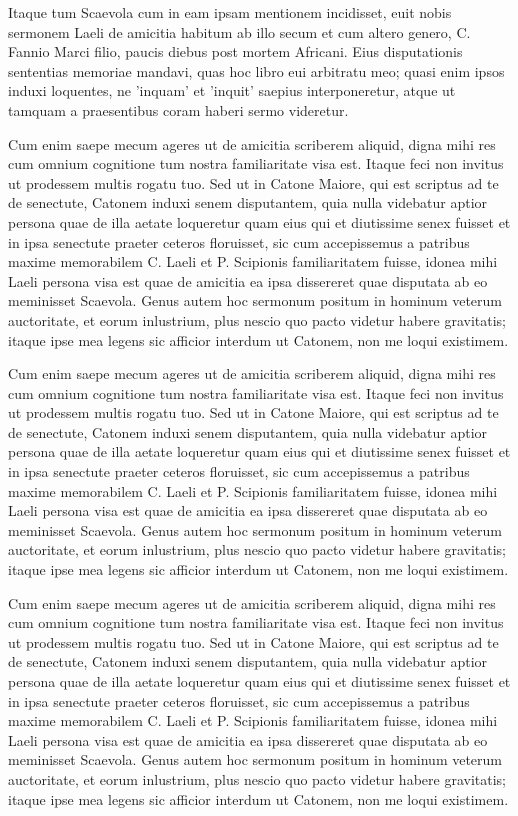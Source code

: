 \documentclass[a4paper]{book}
\begin{document}
\pstart%
    Itaque tum Scaevola cum in eam ipsam mentionem incidisset, euit nobis sermonem Laeli de amicitia habitum ab illo secum et cum altero genero, C. Fannio Marci filio, paucis diebus post mortem Africani. Eius disputationis sententias memoriae mandavi, quas hoc libro eui arbitratu meo; quasi enim ipsos induxi loquentes, ne 'inquam' et 'inquit' saepius interponeretur, atque ut tamquam a praesentibus coram haberi sermo videretur.%
\pend

\pstart%
    Cum enim saepe mecum ageres ut de amicitia scriberem aliquid, digna mihi res cum omnium cognitione tum nostra familiaritate visa est. Itaque feci non invitus ut prodessem multis rogatu tuo. Sed ut in Catone Maiore, qui est scriptus ad te de senectute, Catonem induxi senem disputantem, quia nulla videbatur aptior persona quae de illa aetate loqueretur quam eius qui et diutissime senex fuisset et in ipsa senectute praeter ceteros floruisset, sic cum accepissemus a patribus maxime memorabilem C. Laeli et P. Scipionis familiaritatem fuisse, idonea mihi Laeli persona visa est quae de amicitia ea ipsa dissereret quae disputata ab eo meminisset Scaevola. Genus autem hoc sermonum positum in hominum veterum auctoritate, et eorum inlustrium, plus nescio quo pacto videtur habere gravitatis; itaque ipse mea legens sic afficior interdum ut Catonem, non me loqui existimem.%
\pend

\pstart%
    Cum enim saepe mecum ageres ut de amicitia scriberem aliquid, digna mihi res cum omnium cognitione tum nostra familiaritate visa est. Itaque feci non invitus ut prodessem multis rogatu tuo. Sed ut in Catone Maiore, qui est scriptus ad te de senectute, Catonem induxi senem disputantem, quia nulla videbatur aptior persona quae de illa aetate loqueretur quam eius qui et diutissime senex fuisset et in ipsa senectute praeter ceteros floruisset, sic cum accepissemus a patribus maxime memorabilem C. Laeli et P. Scipionis familiaritatem fuisse, idonea mihi Laeli persona visa est quae de amicitia ea ipsa dissereret quae disputata ab eo meminisset Scaevola. Genus autem hoc sermonum positum in hominum veterum auctoritate, et eorum inlustrium, plus nescio quo pacto videtur habere gravitatis; itaque ipse mea legens sic afficior interdum ut Catonem, non me loqui existimem.%
\pend

\pstart%
    Cum enim saepe mecum ageres ut de amicitia scriberem aliquid, digna mihi res cum omnium cognitione tum nostra familiaritate visa est. Itaque feci non invitus ut prodessem multis rogatu tuo. Sed ut in Catone Maiore, qui est scriptus ad te de senectute, Catonem induxi senem disputantem, quia nulla videbatur aptior persona quae de illa aetate loqueretur quam eius qui et diutissime senex fuisset et in ipsa senectute praeter ceteros floruisset, sic cum accepissemus a patribus maxime memorabilem C. Laeli et P. Scipionis familiaritatem fuisse, idonea mihi Laeli persona visa est quae de amicitia ea ipsa dissereret quae disputata ab eo meminisset Scaevola. Genus autem hoc sermonum positum in hominum veterum auctoritate, et eorum inlustrium, plus nescio quo pacto videtur habere gravitatis; itaque ipse mea legens sic afficior interdum ut Catonem, non me loqui existimem.%
\pend

\endnumbering
\end{document}
